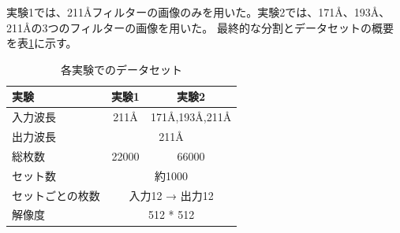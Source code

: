 実験1では、211Åフィルターの画像のみを用いた。実験2では、171Å、193Å、211Åの3つのフィルターの画像を用いた。
最終的な分割とデータセットの概要を表\ref{tab:dataset}に示す。

\begin{table}[h]
    \centering
    \begin{tabular}{l|c|c}
    \hline
    実験 & 実験1 & 実験2 \\
    \hline\hline
    入力波長 & 211Å & 171Å,193Å,211Å \\
    \hline
    出力波長 & \multicolumn{2}{c}{211Å} \\
    \hline
    総枚数 & 22000 & 66000 \\
    \hline
    セット数 & \multicolumn{2}{c}{約1000} \\
    \hline
    セットごとの枚数 & \multicolumn{2}{c}{入力12 → 出力12} \\
    \hline
    解像度 & \multicolumn{2}{c}{512 * 512} \\
    \hline
    \end{tabular}
    \caption{各実験でのデータセット}
    \label{tab:dataset}
\end{table}
